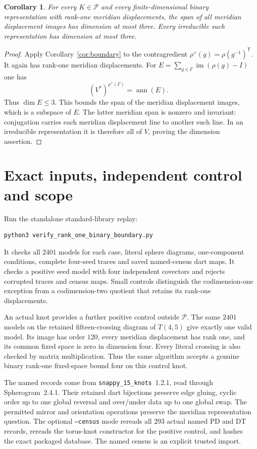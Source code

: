 \documentclass[11pt]{article}
\newtheorem{corollary}[lemma]{Corollary}
\begin{document}
\begin{corollary}\label{cor:dual}
For every $K\in\mathcal P$ and every finite-dimensional binary
representation with rank-one meridian displacements, the span of
all meridian displacement images has dimension at most three.
Every irreducible such representation has dimension at most three.
\end{corollary}
\begin{proof}
Apply Corollary~\ref{cor:boundary} to the contragredient
$\rho^\vee(g)=\rho(g^{-1})^{\mathsf T}$. It again has rank-one
meridian displacements. For
$E=\sum_{g\in\Gamma}\operatorname{im}(\rho(g)-I)$ one has
\[
                          (V^*)^{\rho^\vee(\Gamma)}=\operatorname{ann}(E).
\]
Thus $\dim E\le3$. This bounds the span of the meridian displacement
images, which is a subspace of $E$. The latter meridian span is
nonzero and invariant: conjugation carries each meridian displacement
line to another such line. In an irreducible representation it is
therefore all of $V$, proving the dimension assertion.
\end{proof}

\section{Exact inputs, independent control and scope}

Run the standalone standard-library replay:
\begin{verbatim}
python3 verify_rank_one_binary_boundary.py
\end{verbatim}
It checks all $2401$ models for each case, literal sphere diagrams,
one-component conditions, complete four-seed traces and saved
named-census dart maps. It checks a positive seed model with four
independent covectors and rejects corrupted traces and census maps.
Small controls distinguish the codimension-one exception from a
codimension-two quotient that retains its rank-one displacements.

An actual knot provides a further positive control outside $\mathcal P$.
The same $2401$ models on the retained fifteen-crossing diagram of
$T(4,5)$ give exactly one valid model. Its image has order $120$,
every meridian displacement has rank one, and its common fixed space
is zero in dimension four. Every literal crossing is also checked
by matrix multiplication. Thus the same algorithm accepts a genuine
binary rank-one fixed-space bound four on this control knot.

The named records come from \texttt{snappy\_15\_knots}~1.2.1,
read through Spherogram~2.4.1. Their retained dart bijections preserve
edge gluing, cyclic order up to one global reversal and over/under
data up to one global swap. The permitted mirror and orientation
operations preserve the meridian representation question.
The optional \texttt{--census} mode rereads all $293$ actual named
PD and DT records, rereads the torus-knot constructor for the positive
control, and hashes the exact packaged database.
The named census is an explicit trusted import.
\end{document}
